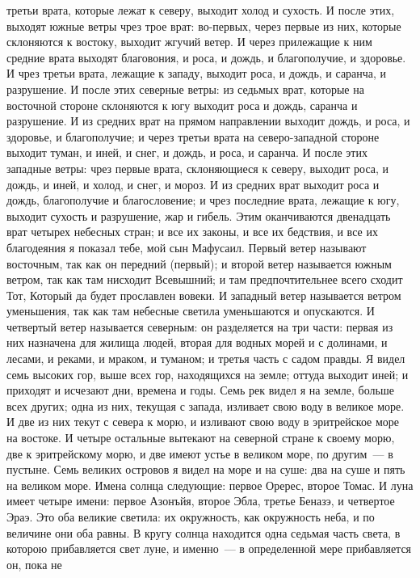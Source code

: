 третьи врата, которые лежат к северу, выходит холод и сухость.
И после этих, выходят южные ветры чрез трое врат: во-первых, через
первые из них, которые склоняются к востоку, выходит жгучий ветер.
И через прилежащие к ним средние врата выходят благовония, и роса, и
дождь, и благополучие, и здоровье.
И чрез третьи врата, лежащие к западу, выходит роса, и дождь, и саранча,
и разрушение.
И после этих северные ветры: из седьмых врат, которые на восточной
стороне склоняются к югу выходит роса и дождь, саранча и разрушение.
И из средних врат на прямом направлении выходит дождь, и роса, и
здоровье, и благополучие; и через третьи врата на северо-западной стороне
выходит туман, и иней, и снег, и дождь, и роса, и саранча.
И после этих западные ветры: чрез первые врата, склоняющиеся к северу,
выходит роса, и дождь, и иней, и холод, и снег, и мороз.
И из средних врат выходит роса и дождь, благополучие и благословение;
и чрез последние врата, лежащие к югу, выходит сухость и разрушение, жар и
гибель.
Этим оканчиваются двенадцать врат четырех небесных стран; и все их
законы, и все их бедствия, и все их благодеяния я показал тебе, мой сын
Мафусаил.
Первый ветер называют восточным, так как он передний (первый); и
второй ветер называется южным ветром, так как там нисходит Всевышний; и там
предпочтительнее всего сходит Тот, Который да будет прославлен вовеки.
И западный ветер называется ветром уменьшения, так как там небесные
светила уменьшаются и опускаются.
И четвертый ветер называется северным: он разделяется на три части:
первая из них назначена для жилища людей, вторая для водных морей и с долинами,
и лесами, и реками, и мраком, и туманом; и третья часть с садом правды.
Я видел семь высоких гор, выше всех гор, находящихся на земле; оттуда
выходит иней; и приходят и исчезают дни, времена и годы.
Семь рек видел я на земле, больше всех других; одна из них, текущая с
запада, изливает свою воду в великое море.
И две из них текут с севера к морю, и изливают свою воду в эритрейское
море на востоке.
И четыре остальные вытекают на северной стране к своему морю, две к
эритрейскому морю, и две имеют устье в великом море, по другим~--- в пустыне.
Семь великих островов я видел на море и на суше: два на суше и пять на
великом море.
Имена солнца следующие: первое Оререс, второе Томас.
И луна имеет четыре имени: первое Азонъйя, второе Эбла, третье Беназэ,
и четвертое Эраэ.
Это оба великие светила: их окружность, как окружность неба, и по
величине они оба равны.
В кругу солнца находится одна седьмая часть света, в которою
прибавляется свет луне, и именно~--- в определенной мере прибавляется он, пока не

